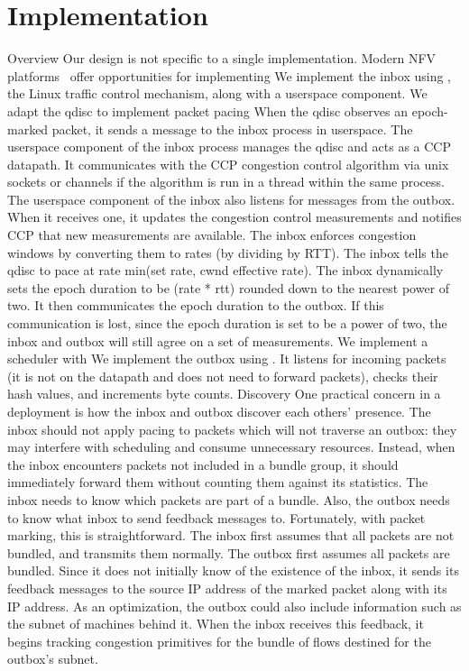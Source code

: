 \section{Implementation}\label{s:impl}
\begin{outline}
\1 Overview
\1 Our design is not specific to a single implementation.
    \2 Modern NFV platforms~\cite{netbricks, bess} offer opportunities for implementing \name
    \2 We implement the inbox using , the Linux traffic control mechanism, along with a userspace component. We adapt the  qdisc to implement packet pacing
        \3 When the qdisc observes an epoch-marked packet, it sends a message to the inbox process in userspace.
        \3 The userspace component of the inbox process manages the qdisc and acts as a CCP datapath. It communicates with the CCP congestion control algorithm via unix sockets or channels if the algorithm is run in a thread within the same process.
        \3 The userspace component of the inbox also listens for messages from the outbox. When it receives one, it updates the congestion control measurements and notifies CCP that new measurements are available.
        \3 The inbox enforces congestion windows by converting them to rates (by dividing by RTT). The inbox tells the qdisc to pace at rate min(set rate, cwnd effective rate).
        \3 The inbox dynamically sets the epoch duration to be (rate * rtt) rounded down to the nearest power of two. It then communicates the epoch duration to the outbox.
            \4 If this communication is lost, since the epoch duration is set to be a power of two, the inbox and outbox will still agree on a set of measurements.
    \2 We implement a scheduler with 
    \2 We implement the outbox using .
        \3 It listens for incoming packets (it is not on the datapath and does not need to forward packets), checks their hash values, and increments byte counts.
\1 Discovery 
    \2 One practical concern in a \name deployment is how the inbox and outbox discover each others' presence.
    \2 The inbox should not apply pacing to packets which will not traverse an outbox: they may interfere with scheduling and consume unnecessary resources.
        \3 Instead, when the inbox encounters packets not included in a bundle group, it should immediately forward them without counting them against its statistics.
        \3 The inbox needs to know which packets are part of a bundle.
    \2 Also, the outbox needs to know what inbox to send feedback messages to.
    \2 Fortunately, with packet marking, this is straightforward. The inbox first assumes that all packets are not bundled, and transmits them normally.
    \2 The outbox first assumes all packets are bundled. Since it does not initially know of the existence of the inbox, it sends its feedback messages to the source IP address of the marked packet along with its IP address. As an optimization, the outbox could also include information such as the subnet of machines behind it.
        \3 When the inbox receives this feedback, it begins tracking congestion primitives for the bundle of flows destined for the outbox's subnet.
\end{outline}